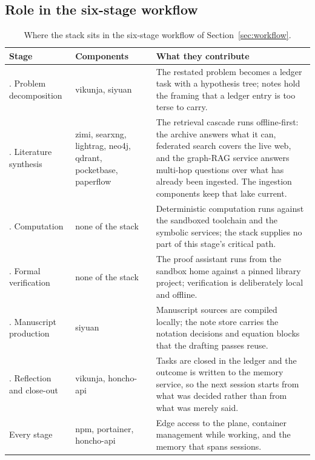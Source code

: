 \documentclass[10pt]{article}
\begin{document}
\subsection{Role in the six-stage workflow}

\begin{table}[H]
\centering\small
\caption{Where the stack sits in the six-stage workflow of Section~\ref{sec:workflow}.}\label{tab:stackstages}
\renewcommand{\arraystretch}{1.15}
\begin{tabularx}{\textwidth}{@{}>{\raggedright\arraybackslash}p{2.9cm} >{\raggedright\arraybackslash}p{3.5cm} X@{}}
\toprule
\textbf{Stage} & \textbf{Components} & \textbf{What they contribute} \\
\midrule
1. Problem decomposition & vikunja, siyuan & The restated problem becomes a ledger task with a hypothesis tree; notes hold the framing that a ledger entry is too terse to carry. \\
2. Literature synthesis & zimi, searxng, lightrag, neo4j, qdrant, pocketbase, paperflow & The retrieval cascade runs offline-first: the archive answers what it can, federated search covers the live web, and the graph-RAG service answers multi-hop questions over what has already been ingested. The ingestion components keep that lake current. \\
3. Computation & none of the stack & Deterministic computation runs against the sandboxed toolchain and the symbolic services; the stack supplies no part of this stage's critical path. \\
4. Formal verification & none of the stack & The proof assistant runs from the sandbox home against a pinned library project; verification is deliberately local and offline. \\
5. Manuscript production & siyuan & Manuscript sources are compiled locally; the note store carries the notation decisions and equation blocks that the drafting passes reuse. \\
6. Reflection and close-out & vikunja, honcho-api & Tasks are closed in the ledger and the outcome is written to the memory service, so the next session starts from what was decided rather than from what was merely said. \\
Every stage & npm, portainer, honcho-api & Edge access to the plane, container management while working, and the memory that spans sessions. \\
\bottomrule
\end{tabularx}
\end{table}
\end{document}
